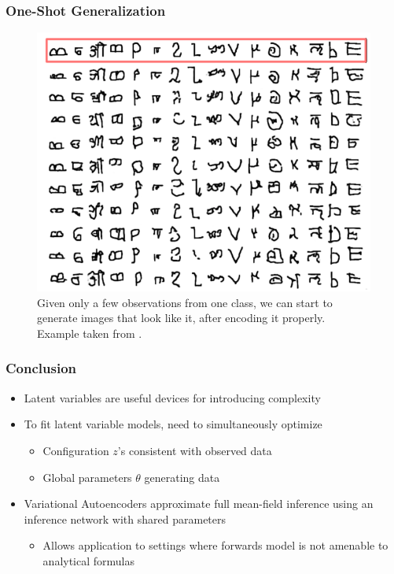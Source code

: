 \documentclass[10pt,mathserif]{beamer}
\begin{document}
\begin{frame}
  \frametitle{One-Shot Generalization}
  \begin{figure}[ht]
  \centering
  \includegraphics[width=0.5\paperwidth]{figure/vae_omniglot}
  \caption{Given only a few observations from one class, we can start to
    generate images that look like it, after encoding it properly. Example taken
    from \citep{rezende2016one}.}
\end{figure}
\end{frame}

\begin{frame}
  \frametitle{Conclusion}
  \begin{itemize}
  \item Latent variables are useful devices for introducing complexity
  \item To fit latent variable models, need to simultaneously optimize
    \begin{itemize}
    \item Configuration $z$'s consistent with observed data
    \item Global parameters $\theta$ generating data
    \end{itemize}
  \item Variational Autoencoders approximate full mean-field inference using an
    inference network with shared parameters
    \begin{itemize}
    \item Allows application to settings where forwards model is not amenable to
      analytical formulas
    \end{itemize}
  \end{itemize}
\end{frame}
\end{document}
